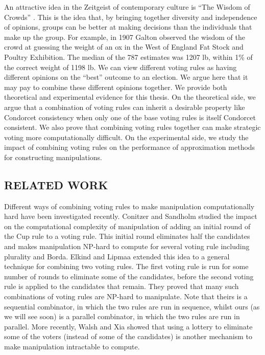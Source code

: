 \documentclass{ecai2012}
\newcommand\lirong[1]{}
\begin{document}
An attractive idea in the Zeitgeist of
contemporary culture is ``The Wisdom of Crowds''
\cite{wisdomcrowds}. This is the idea
that, by bringing together diversity
and independence of opinions,
groups can be better at making decisions than
the individuals that make up the group.
For example, in 1907 Galton observed the
wisdom of the crowd at guessing the weight
of an ox in the West of England Fat Stock and
Poultry Exhibition. The median of the 787 estimates
was 1207 lb, within 1\% of the correct weight of
1198 lb.
%
%
We can view different voting rules as having
different opinions on the ``best'' outcome
to an election. We argue here
that it may pay to combine these different opinions together.
We provide both theoretical and experimental
evidence for this thesis. On the theoretical
side, we argue that a combination of voting rules
can inherit a desirable property like
Condorcet consistency when only one of the base
voting rules is itself Condorcet consistent.
We also prove that combining
voting rules together can make strategic voting
more computationally difficult.
On the experimental
side, we study the impact of combining
voting rules on the performance of approximation methods
for constructing manipulations.

\subsection{RELATED WORK}\lirong{Moved to here.}
Different ways of combining voting rules to make manipulation computationally hard have been investigated recently.
Conitzer and Sandholm
\cite{csijcai03} studied the impact on the
computational complexity of manipulation
of adding an initial round of the Cup rule to a voting
rule.
This initial round eliminates half the candidates and
makes manipulation NP-hard to compute
for several voting rule including plurality and Borda.
%
Elkind and Lipmaa
\cite{elisaac05} extended this idea to
a general technique for combining two voting rules.
The first voting rule is run for some number
of rounds to eliminate some of the candidates,
before the second voting rule is applied to
the candidates that remain. They proved that
many such combinations of voting rules are NP-hard
to manipulate.
Note that theirs is a sequential combinator,
in which the two rules are run in sequence,
whilst ours (as we will see soon) is a parallel combinator,
in which the two rules are run in parallel.
More recently, Walsh and Xia
\cite{wxaamas12} showed that
using a lottery to eliminate some of the voters
(instead of some of the candidates) is another
mechanism to make manipulation intractable to compute.
\end{document}
